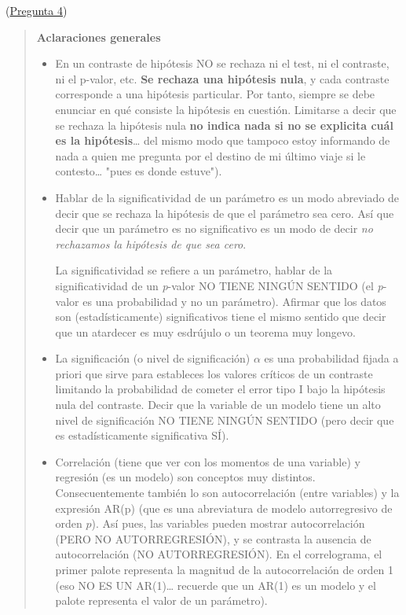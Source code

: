 \documentclass[10pt]{article}
\begin{document}
(\hyperref[sec:orge9abf7a]{Pregunta 4})


\begin{quote}
\textbf{Aclaraciones generales}

\begin{itemize}
\item En un contraste de hipótesis NO se rechaza ni el test, ni el
contraste, ni el p-valor, etc. \textbf{Se rechaza una hipótesis nula}, y
cada contraste corresponde a una hipótesis particular. Por tanto,
siempre se debe enunciar en qué consiste la hipótesis en cuestión.
Limitarse a decir que se rechaza la hipótesis nula \textbf{no indica nada
si no se explicita cuál es la hipótesis}\ldots{} del mismo modo que
tampoco estoy informando de nada a quien me pregunta por el destino
de mi último viaje si le contesto\ldots{} "pues es donde estuve").
\end{itemize}


\begin{itemize}
\item Hablar de la significatividad de un parámetro es un modo abreviado
de decir que se rechaza la hipótesis de que el parámetro sea
cero. Así que decir que un parámetro es no significativo es un modo
de decir \emph{no rechazamos la hipótesis de que sea cero}.

La significatividad se refiere a un parámetro, hablar de la
significatividad de un \emph{p}-valor NO TIENE NINGÚN SENTIDO (el
\emph{p}-valor es una probabilidad y no un parámetro). Afirmar que los
datos son (estadísticamente) significativos tiene el mismo sentido
que decir que un atardecer es muy esdrújulo o un teorema muy
longevo.
\end{itemize}


\begin{itemize}
\item La significación (o nivel de significación) \(\alpha\) es una
probabilidad fijada a priori que sirve para estableces los valores
críticos de un contraste limitando la probabilidad de cometer el
error tipo I bajo la hipótesis nula del contraste. Decir que la
variable de un modelo tiene un alto nivel de significación NO TIENE
NINGÚN SENTIDO (pero decir que es estadísticamente significativa
SÍ).
\end{itemize}


\begin{itemize}
\item Correlación (tiene que ver con los momentos de una variable) y
regresión (es un modelo) son conceptos muy
distintos. Consecuentemente también lo son autocorrelación (entre
variables) y la expresión AR(p) (que es una abreviatura de modelo
autorregresivo de orden \(p\)). Así pues, las variables pueden mostrar
autocorrelación (PERO NO AUTORREGRESIÓN), y se contrasta la ausencia
de autocorrelación (NO AUTORREGRESIÓN). En el correlograma, el
primer palote representa la magnitud de la autocorrelación de orden
1 (eso NO ES UN AR(1)\ldots{} recuerde que un AR(1) es un modelo y el
palote representa el valor de un parámetro).
\end{itemize}



\end{quote}
\end{document}
